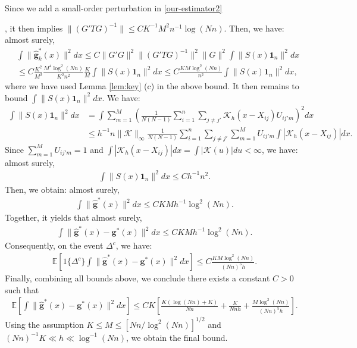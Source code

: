 \documentclass[preprint,11pt]{article}
\newcommand{\mbb}{\mathbb}
\newcommand{\mbf}{\mathbf}
\newcommand{\mcal}{\mathcal}
\numberwithin{equation}{section}
\begin{document}
Since we add a small-order perturbation in \eqref{our-estimator2}

, it then implies $\|(G'TG)^{-1}\|\le CK^{-1}M^2n^{-1}\log (Nn)$. Then, we have: almost surely,
\begin{align*}
    &\int \|\bm{\widehat{g}}_k^*(x)\|^2dx\le C\|G'G\|^2\|(G'TG)^{-1}\|^2\|G\|^2\int \|S(x)\mbf{1}_n\|^2dx\\
    &\le C\frac{K^2}{M^2}\frac{M^4\log^2(Nn)}{K^2n^2}\frac{K}{M}\int \|S(x)\mbf{1}_n\|^2dx\le C\frac{KM\log^2(Nn)}{n^2}\int \|S(x)\mbf{1}_n\|^2dx,
\end{align*}
where we have used Lemma \ref{lem:key} (c) in the above bound. It then remains to bound $\int \|S(x)\mbf{1}_n\|^2dx$. We have:
\begin{align*}
    \int \|S(x)\mbf{1}_n\|^2dx&=\int\sum_{m=1}^M \left(\frac{1}{N(N-1)}\sum_{i=1}^n \sum_{j\neq j'}\mcal{K}_h(x-X_{ij})U_{ij'm}\right)^2dx\\
    &\le h^{-1}n\|\mcal{K}\|_{\infty}\frac{1}{N(N-1)}\sum_{i=1}^n \sum_{j\neq j'}\sum_{m=1}^MU_{ij'm}\int|\mcal{K}_h(x-X_{ij})|dx.
\end{align*}
Since $\sum_{m=1}^MU_{ij'm}=1$ and $\int|\mcal{K}_h(x-X_{ij})|dx=\int|\mcal{K}(u)|du<\infty$, we have: almost surely,
\begin{align}\label{intS1n-crude-bound}
    \int \|S(x)\bm{1}_n\|^2dx\le Ch^{-1}n^2.
\end{align}
Then, we obtain: almost surely,
\begin{align}\label{hatgstar-crude-bound}
    \int\|\bm{\widehat{g}}^*(x)\|^2dx\le CKMh^{-1}\log^2 (Nn).
\end{align}
Together, it yields that almost surely,
\begin{align*}
    \int \|\bm{\widehat{g}}^*(x)-\bm{g}^*(x)\|^2dx\le CKMh^{-1}\log^2(Nn).
\end{align*}
Consequently, on the event $\Delta^c$, we have:
\begin{align*}
    \mbb{E}\left[1\{\Delta^c\}\int \|\bm{\widehat{g}}^*(x)-\bm{g}^*(x)\|^2dx\right]\le C\frac{KM\log^2(Nn)}{(Nn)^5h}.
\end{align*}
Finally, combining all bounds above, we conclude there exists a constant $C>0$ such that
\begin{align*}
    \mbb{E}\left[\int \|\bm{\widehat{g}}^*(x)-\bm{g}^*(x)\|^2dx\right]\le CK\left[\frac{K(\log (Nn)+K)}{Nn}+\frac{K}{Nnh}+\frac{M\log^2(Nn)}{(Nn)^5h}\right].
\end{align*}
Using the assumption $K\leq M\leq [Nn/\log^2(Nn)]^{1/2}$ and $ (Nn)^{-1}K\ll h\ll \log^{-1}(Nn)$, we obtain the final bound.
\end{document}
